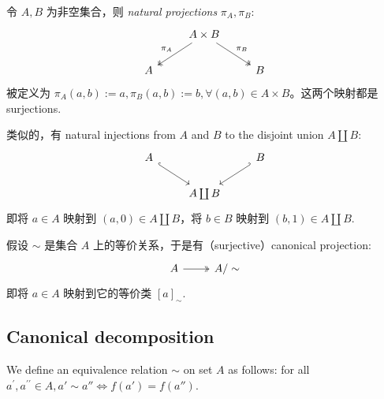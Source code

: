 \begin{eg}\label{eg:1.2.4}
    令 \(A, B\) 为非空集合，则 \emph{natural projections} \(\pi_A, \pi_B\):
    \[\begin{tikzcd}
            & {A \times B} \\
            A && B
            \arrow["{\pi_A}"', two heads, from=1-2, to=2-1]
            \arrow["{\pi_B}", two heads, from=1-2, to=2-3]
        \end{tikzcd}\]
    被定义为 \(\pi_A(a, b) := a, \pi_B(a, b) := b, \forall (a, b)\in A\times B\)。这两个映射都是 surjections.
\end{eg}
\begin{eg}\label{eg:1.2.5}
    类似的，有 natural injections from \(A\) and \(B\) to the disjoint union \(A \coprod B\):
    \[\begin{tikzcd}
            A && B \\
            & {A \coprod B}
            \arrow[hook, from=1-1, to=2-2]
            \arrow[hook', from=1-3, to=2-2]
        \end{tikzcd}\]
    即将 \(a \in A\) 映射到 \((a, 0) \in A \coprod B\)，将 \(b \in B\) 映射到 \((b, 1) \in A \coprod B\).
\end{eg}
\begin{eg}\label{eg:1.2.6}
    假设 \(\sim \) 是集合 \(A\) 上的等价关系，于是有（surjective）canonical projection:
    \[\begin{tikzcd}
            A & {A / \sim}
            \arrow[two heads, from=1-1, to=1-2]
        \end{tikzcd}\]
    即将 \(a \in A\) 映射到它的等价类 \([a]_{\sim }\).
\end{eg}

\subsection{Canonical decomposition}\label{sec:1.2.8}
We define an equivalence relation $\sim$ on set $A$ as follows: for all $a^{\prime}, a^{\prime\prime}\in A, a'\sim a''\iff f(a')=f(a'')$.

